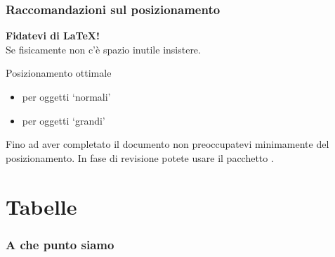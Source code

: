 \begin{frame}
  \frametitle{Raccomandazioni sul posizionamento}
	\begin{center}
		\textbf{Fidatevi di \LaTeX!}\\
		Se fisicamente non c'\`e spazio inutile insistere.
	\end{center}
  \medskip
	\begin{block}{Posizionamento ottimale}
		\begin{itemize}
			\item {} per oggetti `normali'
			\item {} per oggetti `grandi'
		\end{itemize}
	\end{block}
	Fino ad aver completato il documento non preoccupatevi minimamente del posizionamento. In fase di revisione potete usare il pacchetto .
\end{frame}
\section{Tabelle}
\begin{frame}
  \frametitle{A che punto siamo}
\end{frame}
